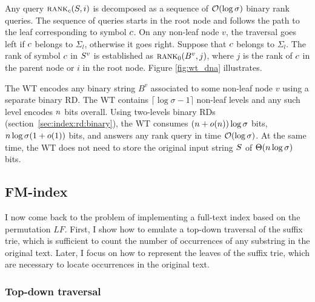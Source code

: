 Any query $\textsc{rank}_{c}(S,i)$ is decomposed as a sequence of $\mathcal{O}(\log{\sigma})$ binary rank queries.
The sequence of queries starts in the root node and follows the path to the leaf corresponding to symbol $c$.
On any non-leaf node $v$, the traversal goes left if $c$ belongs to $\Sigma_l$, otherwise it goes right.
Suppose \wlogs that $c$ belongs to $\Sigma_l$.
The rank of symbol $c$ in $S^v$ is established as $\textsc{rank}_0(B^v, j)$, where $j$ is the rank of $c$ in the parent node or $i$ in the root node.
Figure \ref{fig:wt_dna} illustrates.

The WT encodes any binary string $B^v$ associated to some non-leaf node $v$ using a separate binary RD.
The WT contains $\lceil \log \sigma - 1 \rceil$ non-leaf levels and any such level encodes $n$ bits overall.
Using two-levels binary RDs (section~\ref{sec:index:rd:binary}), the WT consumes $(n + o(n)) \log \sigma$ bits, \ie $n \log \sigma (1 + o(1))$ bits, and answers any rank query in time $\mathcal{O}(\log{\sigma})$.
At the same time, the WT does not need to store the original input string $S$ of $\Theta(n \log{\sigma})$ bits.

\subsection{FM-index}
\label{sub:fmtrie}

I now come back to the problem of implementing a full-text index based on the permutation $LF$.
First, I show how to emulate a top-down traversal of the suffix trie, which is sufficient to count the number of occurrences of any substring in the original text.
Later, I focus on how to represent the leaves of the suffix trie, which are necessary to locate occurrences in the original text.

\subsubsection{Top-down traversal}


